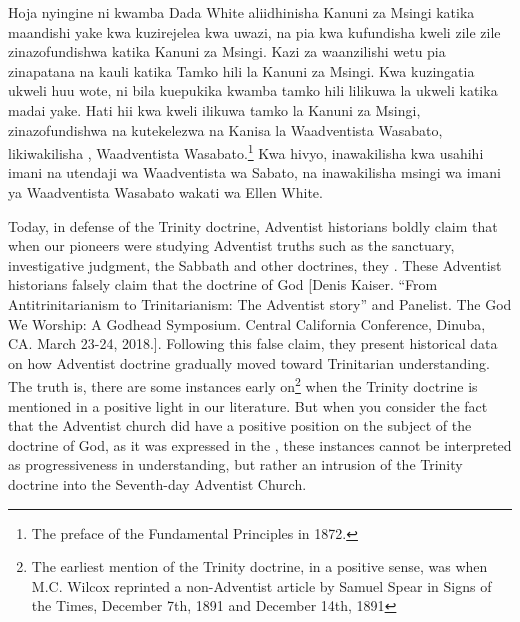Hoja nyingine ni kwamba Dada White aliidhinisha Kanuni za Msingi katika maandishi yake kwa kuzirejelea kwa uwazi, na pia kwa kufundisha kweli zile zile zinazofundishwa katika Kanuni za Msingi. Kazi za waanzilishi wetu pia zinapatana na kauli katika Tamko hili la Kanuni za Msingi. Kwa kuzingatia ukweli huu wote, ni bila kuepukika kwamba tamko hili lilikuwa la ukweli katika madai yake. Hati hii kwa kweli ilikuwa tamko la Kanuni za Msingi, zinazofundishwa na kutekelezwa na Kanisa la Waadventista Wasabato, likiwakilisha ,  Waadventista Wasabato.\footnote{The preface of the Fundamental Principles in 1872.} Kwa hivyo, inawakilisha kwa usahihi imani na utendaji wa Waadventista wa Sabato, na inawakilisha msingi wa imani ya Waadventista Wasabato wakati wa Ellen White.


Today, in defense of the Trinity doctrine, Adventist historians boldly claim that when our pioneers were studying Adventist truths such as the sanctuary, investigative judgment, the Sabbath and other doctrines, they . These Adventist historians falsely claim that the doctrine of God [Denis Kaiser. “From Antitrinitarianism to Trinitarianism: The Adventist story” and Panelist. The God We Worship: A Godhead Symposium. Central California Conference, Dinuba, CA. March 23-24, 2018.]. Following this false claim, they present historical data on how Adventist doctrine gradually moved toward Trinitarian understanding. The truth is, there are some instances early on\footnote{The earliest mention of the Trinity doctrine, in a positive sense, was when M.C. Wilcox reprinted a non-Adventist article by Samuel Spear in Signs of the Times, December 7th, 1891 and December 14th, 1891} when the Trinity doctrine is mentioned in a positive light in our literature. But when you consider the fact that the Adventist church did have a positive position on the subject of the doctrine of God, as it was expressed in the , these instances cannot be interpreted as progressiveness in understanding, but rather an intrusion of the Trinity doctrine into the Seventh-day Adventist Church.


